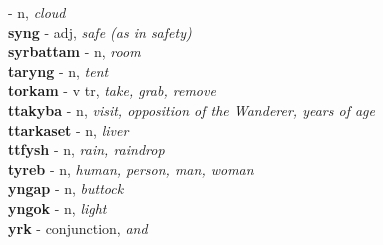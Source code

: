  - n, \emph{cloud}\\ \vspace{7pt}\textbf{syng}   - adj, \emph{safe (as in safety)}\\ \vspace{7pt}\textbf{syrbattam}   - n, \emph{room}\\ \vspace{7pt}\textbf{taryng}   - n, \emph{tent}\\ \vspace{7pt}\textbf{torkam}   - v tr, \emph{take, grab, remove}\\ \vspace{7pt}\textbf{ttakyba}   - n, \emph{visit, opposition of the Wanderer, years of age}\\ \vspace{7pt}\textbf{ttarkaset}   - n, \emph{liver}\\ \vspace{7pt}\textbf{ttfysh}   - n, \emph{rain, raindrop}\\ \vspace{7pt}\textbf{tyreb}   - n, \emph{human, person, man, woman}\\ \vspace{7pt}\textbf{yngap}   - n, \emph{buttock}\\ \vspace{7pt}\textbf{yngok}   - n, \emph{light}\\ \vspace{7pt}\textbf{yrk}   - conjunction, \emph{and}\\ \vspace{7pt}